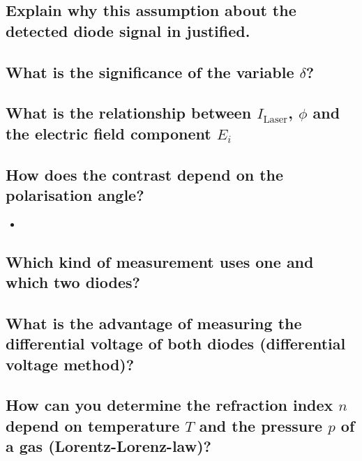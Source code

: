 \subsection*{Explain why this assumption about the detected diode signal in justified.}
\subsection*{What is the significance of the variable $\delta$?}
\subsection*{What is the relationship between $I_\text{Laser}$, $\phi$ and the electric field component $E_i$}

\subsection*{How does the contrast depend on the polarisation angle?}
\begin{itemize}
    \item 
\end{itemize}

\subsection*{Which kind of measurement uses one and which  two diodes?}
\subsection*{What is the advantage of measuring the differential voltage of both diodes (differential voltage method)?}

\subsection*{How can you determine the refraction index $n$ depend on temperature $T$ and the pressure $p$ of a gas (Lorentz-Lorenz-law)?}
